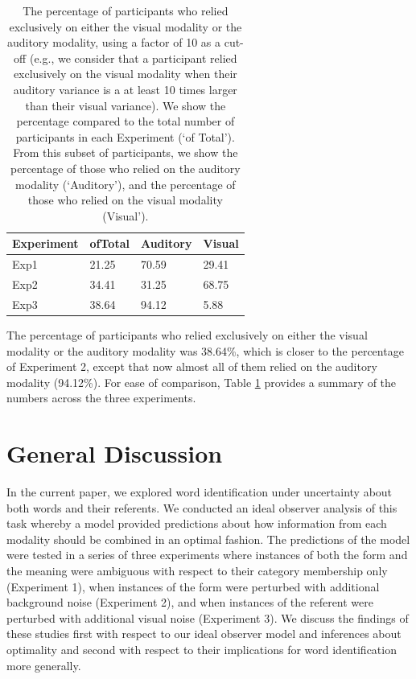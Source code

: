 \documentclass[english,,man,floatsintext]{apa6}
\theoremstyle{definition}
\theoremstyle{definition}
\theoremstyle{definition}
\theoremstyle{remark}
\begin{document}
\begin{table}[tbp]
\begin{center}
\begin{threeparttable}
\caption{\label{tab:exclusive}The percentage of participants who relied exclusively on either the visual modality or the auditory modality, using a factor of 10 as a cut-off (e.g., we consider that a participant relied exclusively on the visual modality when their auditory variance is a at least 10 times larger than their visual variance). We show the percentage compared to the total number of participants in each Experiment (`of Total'). From this subset of participants, we show the percentage of those who relied on the  auditory modality (`Auditory'), and the percentage of those who relied on the visual  modality (Visual').}
\begin{tabular}{llll}
\toprule
Experiment & \multicolumn{1}{c}{ofTotal} & \multicolumn{1}{c}{Auditory} & \multicolumn{1}{c}{Visual}\\
\midrule
Exp1 & 21.25 & 70.59 & 29.41\\
Exp2 & 34.41 & 31.25 & 68.75\\
Exp3 & 38.64 & 94.12 & 5.88\\
\bottomrule
\end{tabular}
\end{threeparttable}
\end{center}
\end{table}

The percentage of participants who relied exclusively on either the
visual modality or the auditory modality was 38.64\%, which is closer to
the percentage of Experiment 2, except that now almost all of them
relied on the auditory modality (94.12\%). For ease of comparison, Table
\ref{tab:exclusive} provides a summary of the numbers across the three
experiments.

\section{General Discussion}\label{general-discussion}

In the current paper, we explored word identification under uncertainty
about both words and their referents. We conducted an ideal observer
analysis of this task whereby a model provided predictions about how
information from each modality should be combined in an optimal fashion.
The predictions of the model were tested in a series of three
experiments where instances of both the form and the meaning were
ambiguous with respect to their category membership only (Experiment 1),
when instances of the form were perturbed with additional background
noise (Experiment 2), and when instances of the referent were perturbed
with additional visual noise (Experiment 3). We discuss the findings of
these studies first with respect to our ideal observer model and
inferences about optimality and second with respect to their
implications for word identification more generally.
\end{document}
